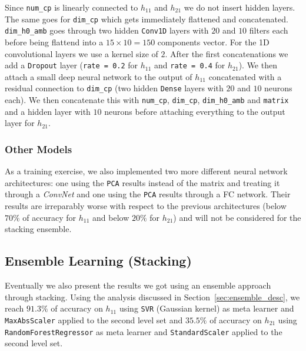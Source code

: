         Since \texttt{num\_cp} is linearly connected to $h_{11}$ and $h_{21}$ we do not insert hidden layers. The same goes for \texttt{dim\_cp} which gets immediately flattened and concatenated. \texttt{dim\_h0\_amb} goes through two hidden \texttt{Conv1D} layers with $20$ and $10$ filters each before being flattend into a $15 \times 10 = 150$ components vector. For the 1D convolutional layers we use a kernel size of $2$. After the first concatenations we add a \texttt{Dropout} layer (\texttt{rate = 0.2} for $h_{11}$ and \texttt{rate = 0.4} for $h_{21}$). We then attach a small deep neural network to the output of $h_{11}$ concatenated with a residual connection to \texttt{dim\_cp} (two hidden \texttt{Dense} layers with $20$ and $10$ neurons each). We then concatenate this with \texttt{num\_cp}, \texttt{dim\_cp}, \texttt{dim\_h0\_amb} and \texttt{matrix} and a hidden layer with $10$ neurons before attaching everything to the output layer for $h_{21}$.
        
    \subsubsection{Other Models}
        As a training exercise, we also implemented two more different neural network architectures: one using the \texttt{PCA} results instead of the matrix and treating it through a \textit{ConvNet} and one using the \texttt{PCA} results through a FC network. Their results are irreparably worse with respect to the previous architectures (below $70\%$ of accuracy for $h_{11}$ and below $20\%$ for $h_{21}$) and will not be considered for the stacking ensemble.
        
\subsection{Ensemble Learning (Stacking)}
    Eventually we also present the results we got using an ensemble approach through stacking. Using the analysis discussed in Section~\ref{sec:ensemble_desc}, we reach $91.3\%$ of accuracy on $h_{11}$ using \texttt{SVR} (Gaussian kernel) as meta learner and \texttt{MaxAbsScaler} applied to the second level set and $35.5\%$ of accuracy on $h_{21}$ using \texttt{RandomForestRegressor} as meta learner and \texttt{StandardScaler} applied to the second level set.